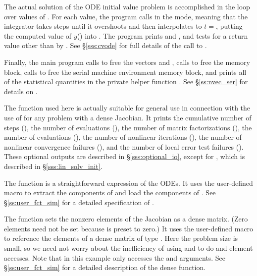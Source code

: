 The actual solution of the ODE initial value problem is accomplished
in the loop over values of .  For each value, the program
calls  in the  mode, meaning that the integrator
takes steps until it overshoots  and then interpolates to 
$t = $, putting the computed value of $y$() into
.  The program prints  and , and tests for a 
return value other than  by .  See 
\S\ref{sss:cvode} for full details of the call to .

Finally, the main program calls  to free the vectors
 and , calls  to free the {\cvodes}
memory block, calls  to free the serial machine
environment memory block, and prints all of the statistical quantities in the
private helper function .
See \S\ref{ss:nvec_ser} for details on .

The function  used here is actually suitable for
general use in connection with the use of {\cvodes} for any problem with 
a dense Jacobian.  It prints the cumulative number of steps
(), the number of  evaluations (), 
the number of matrix factorizations (), 
the number of  evaluations (), 
the number of nonlinear iterations (), 
the number of nonlinear convergence failures (), and 
the number of local error test failures ().
These optional outputs are described in \S\ref{sss:optional_io},
except for , which is described in 
\S\ref{sss:lin_solv_init}.

The function  is a straightforward expression of the ODEs. 
It uses the user-defined macro 
to extract the components of  and load the components of .
See \S\ref{ss:user_fct_sim} for a detailed specification of .

The function  sets the nonzero elements of the Jacobian
as a dense matrix.  (Zero elements need not be set because 
is preset to zero.)  It uses the user-defined macro
to reference the elements of a dense matrix of type .
Here the problem size is small, so we need not worry about the
inefficiency of using  and  to do
 and  element accesses.
Note that in this example  only accesses the  and  arguments.
See \S\ref{ss:user_fct_sim} for a detailed description of the dense  function.

